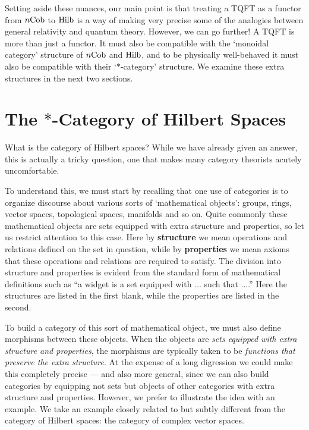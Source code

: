 \documentclass[12pt]{article}
\newcommand{\Hilb}{{\rm Hilb}}
\newcommand{\Cob}{{\rm Cob}}
\begin{document}
Setting aside these nuances, our main point is that treating a TQFT as
a functor from $n\Cob$ to $\Hilb$ is a way of making very precise some
of the analogies between general relativity and quantum theory.
However, we can go further!  A TQFT is more than just a functor.  It
must also be compatible with the `monoidal category' structure of
$n\Cob$ and $\Hilb$, and to be physically well-behaved it must also be
compatible with their `$\ast$-category' structure.  We examine these
extra structures in the next two sections.

\section{The $\ast$-Category of Hilbert Spaces}  
\label{*category}

What is the category of Hilbert spaces?  While we have already given
an answer, this is actually a tricky question, one that makes many
category theorists acutely uncomfortable.  

To understand this, we must start by recalling that one use of 
categories is to organize discourse about various sorts of 
`mathematical objects': groups, rings, vector spaces, topological 
spaces, manifolds and so on.  Quite commonly these mathematical objects 
are sets equipped with extra structure and properties, so let us 
restrict attention to this case.   Here by {\bf structure} we mean 
operations and relations defined on the set in question, while by 
{\bf properties} we mean axioms that these operations and relations 
are required to satisfy.  The division into structure and properties 
is evident from the standard form of mathematical definitions such as 
``a widget is a set equipped with ... such that ....''   Here the 
structures are listed in the first blank, while the properties are 
listed in the second.    

To build a category of this sort of mathematical object, we must also 
define morphisms between these objects.  When the objects are {\it 
sets equipped with extra structure and properties}, the morphisms are 
typically taken to be {\it functions that preserve the extra structure}.
At the expense of a long digression we could make this completely 
precise --- and also more general, since we can also build categories 
by equipping not sets but objects of other categories with extra 
structure and properties.  However, we prefer to illustrate the idea 
with an example.  We take an example closely related to but subtly 
different from the category of Hilbert spaces: the category of 
complex vector spaces.  
\end{document}
